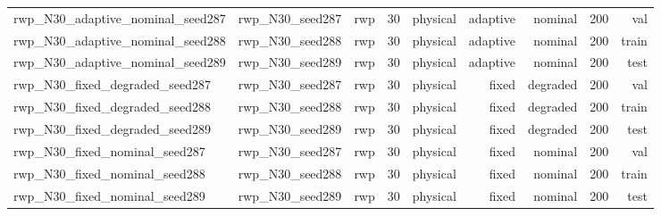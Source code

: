 \begin{tabular}{lrrrrrrrr}
rwp\_N30\_adaptive\_nominal\_seed287 & rwp\_N30\_seed287 & rwp & 30 & physical & adaptive & nominal & 200 & val \\
rwp\_N30\_adaptive\_nominal\_seed288 & rwp\_N30\_seed288 & rwp & 30 & physical & adaptive & nominal & 200 & train \\
rwp\_N30\_adaptive\_nominal\_seed289 & rwp\_N30\_seed289 & rwp & 30 & physical & adaptive & nominal & 200 & test \\
rwp\_N30\_fixed\_degraded\_seed287 & rwp\_N30\_seed287 & rwp & 30 & physical & fixed & degraded & 200 & val \\
rwp\_N30\_fixed\_degraded\_seed288 & rwp\_N30\_seed288 & rwp & 30 & physical & fixed & degraded & 200 & train \\
rwp\_N30\_fixed\_degraded\_seed289 & rwp\_N30\_seed289 & rwp & 30 & physical & fixed & degraded & 200 & test \\
rwp\_N30\_fixed\_nominal\_seed287 & rwp\_N30\_seed287 & rwp & 30 & physical & fixed & nominal & 200 & val \\
rwp\_N30\_fixed\_nominal\_seed288 & rwp\_N30\_seed288 & rwp & 30 & physical & fixed & nominal & 200 & train \\
rwp\_N30\_fixed\_nominal\_seed289 & rwp\_N30\_seed289 & rwp & 30 & physical & fixed & nominal & 200 & test \\
\bottomrule
\end{tabular}
